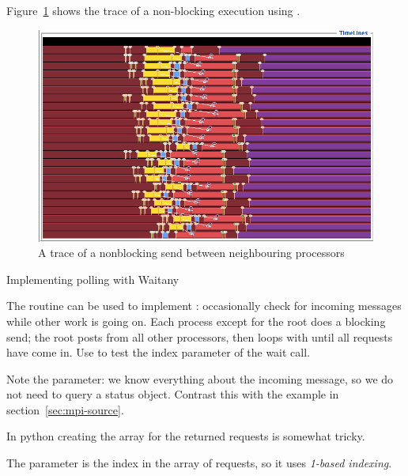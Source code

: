 Figure~\ref{fig:jump-nonblock} shows the trace of a non-blocking execution
using .
\begin{figure}[ht]
\includegraphics[scale=.4]{graphics/linear-nonblock}
\caption{A trace of a nonblocking send between neighbouring processors}
\label{fig:jump-nonblock}
\end{figure}

 {Implementing polling with Waitany}

The  routine can be used to implement
: occasionally check for incoming messages while
other work is going on.
%
%
%
Each process except for the root does a blocking send; the root
posts  from all other processors, then loops
with  until all requests have come in. Use
 to test the index parameter of the wait
call.

Note the  parameter: we know everything
about the incoming message, so we do not need to query a status object.
Contrast this with the example in section~\ref{sec:mpi-source}.

\begin{pythonnote}
  In python creating the array for the returned requests is somewhat
  tricky.
\end{pythonnote}

\begin{fortrannote}
  The  parameter is the index in the array of requests,
  so it uses \emph{1-based indexing}.
\end{fortrannote}

